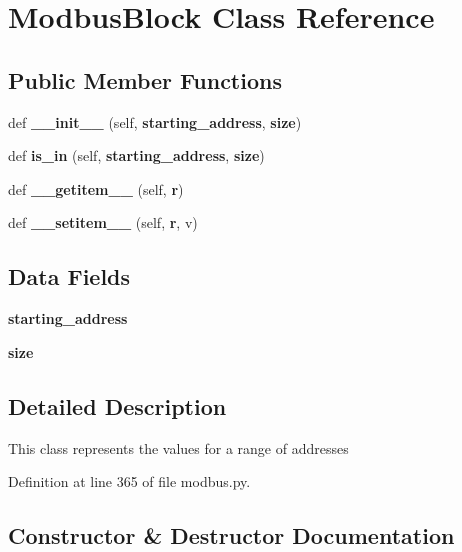 \section{Modbus\+Block Class Reference}
\label{classmodbus__tk_1_1modbus_1_1_modbus_block}
\subsection*{Public Member Functions}
\begin{DoxyCompactItemize}
\item 
def {\bf \+\_\+\+\_\+init\+\_\+\+\_\+} (self, {\bf starting\+\_\+address}, {\bf size})
\item 
def {\bf is\+\_\+in} (self, {\bf starting\+\_\+address}, {\bf size})
\item 
def {\bf \+\_\+\+\_\+getitem\+\_\+\+\_\+} (self, {\bf r})
\item 
def {\bf \+\_\+\+\_\+setitem\+\_\+\+\_\+} (self, {\bf r}, v)
\end{DoxyCompactItemize}
\subsection*{Data Fields}
\begin{DoxyCompactItemize}
\item 
{\bf starting\+\_\+address}
\item 
{\bf size}
\end{DoxyCompactItemize}


\subsection{Detailed Description}
\begin{DoxyVerb}This class represents the values for a range of addresses\end{DoxyVerb}
 

Definition at line 365 of file modbus.\+py.



\subsection{Constructor \& Destructor Documentation}
